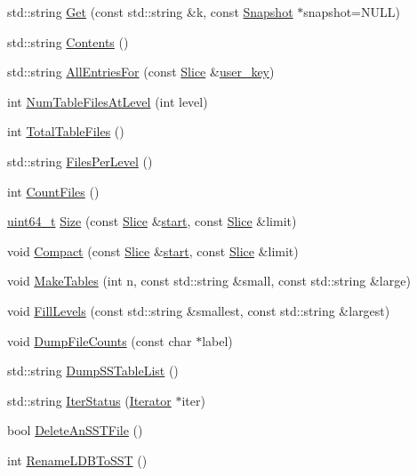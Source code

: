 \begin{DoxyCompactItemize}
\item 
std\-::string \hyperlink{classleveldb_1_1_d_b_test_a6af558e1fca4a9f1bbf86d72d3d4aa6c}{Get} (const std\-::string \&k, const \hyperlink{classleveldb_1_1_snapshot}{Snapshot} $\ast$snapshot=N\-U\-L\-L)
\item 
std\-::string \hyperlink{classleveldb_1_1_d_b_test_a3cf871664bd22c6ed2d6c2a8834b49fc}{Contents} ()
\item 
std\-::string \hyperlink{classleveldb_1_1_d_b_test_adaf171601eaaf2cd24edaa394752f733}{All\-Entries\-For} (const \hyperlink{classleveldb_1_1_slice}{Slice} \&\hyperlink{version__set_8cc_afced2118ae0bf03db7c7e75a21cfd004}{user\-\_\-key})
\item 
int \hyperlink{classleveldb_1_1_d_b_test_aa7c845810f6d57b0655eda370e8de33f}{Num\-Table\-Files\-At\-Level} (int level)
\item 
int \hyperlink{classleveldb_1_1_d_b_test_a05fa745351a41ecc0165b391a605b79e}{Total\-Table\-Files} ()
\item 
std\-::string \hyperlink{classleveldb_1_1_d_b_test_a0e4d6292bcbe450d34b558d48a51a331}{Files\-Per\-Level} ()
\item 
int \hyperlink{classleveldb_1_1_d_b_test_a0c6c0c1d470a50fdcb6cdbc54977e907}{Count\-Files} ()
\item 
\hyperlink{stdint_8h_aaa5d1cd013383c889537491c3cfd9aad}{uint64\-\_\-t} \hyperlink{classleveldb_1_1_d_b_test_a2b16106ccbd302127b5c0575e74e6be1}{Size} (const \hyperlink{classleveldb_1_1_slice}{Slice} \&\hyperlink{db__bench_8cc_ab376b87f96a574a793c03c53e75afec8}{start}, const \hyperlink{classleveldb_1_1_slice}{Slice} \&limit)
\item 
void \hyperlink{classleveldb_1_1_d_b_test_a9b6cd10fd7c8fc54127b0c40c0ac7db5}{Compact} (const \hyperlink{classleveldb_1_1_slice}{Slice} \&\hyperlink{db__bench_8cc_ab376b87f96a574a793c03c53e75afec8}{start}, const \hyperlink{classleveldb_1_1_slice}{Slice} \&limit)
\item 
void \hyperlink{classleveldb_1_1_d_b_test_ace931478fa5ad2c48a8aa95a344e19fd}{Make\-Tables} (int n, const std\-::string \&small, const std\-::string \&large)
\item 
void \hyperlink{classleveldb_1_1_d_b_test_ac291d06db907f5fee7caf04f44f65493}{Fill\-Levels} (const std\-::string \&smallest, const std\-::string \&largest)
\item 
void \hyperlink{classleveldb_1_1_d_b_test_ad045c5203b4ea785ab335ffc3ea833b3}{Dump\-File\-Counts} (const char $\ast$label)
\item 
std\-::string \hyperlink{classleveldb_1_1_d_b_test_afdfc077be555dea7eac220623f6d4deb}{Dump\-S\-S\-Table\-List} ()
\item 
std\-::string \hyperlink{classleveldb_1_1_d_b_test_ad162fa0f5a31e61ee94ba9f45af716f8}{Iter\-Status} (\hyperlink{classleveldb_1_1_iterator}{Iterator} $\ast$iter)
\item 
bool \hyperlink{classleveldb_1_1_d_b_test_abcb2ebeb0733670d7634079c587426d2}{Delete\-An\-S\-S\-T\-File} ()
\item 
int \hyperlink{classleveldb_1_1_d_b_test_a104ae4b9292787d0cfc9a9fb93cc5fa8}{Rename\-L\-D\-B\-To\-S\-S\-T} ()
\end{DoxyCompactItemize}
